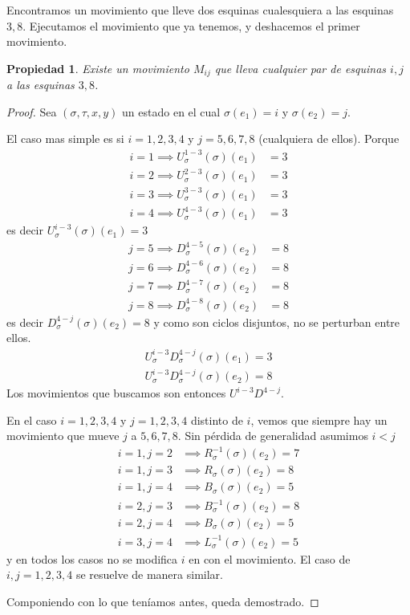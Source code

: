 \documentclass{article}
\newtheorem{propiedad}{Propiedad}[section]
\theoremstyle{definition}
\begin{document}
Encontramos un movimiento que lleve dos esquinas cualesquiera a las esquinas $3,8$. Ejecutamos el movimiento que ya tenemos, y deshacemos el primer movimiento.
\begin{propiedad}
    Existe un movimiento $M_{ij}$ que lleva cualquier par de esquinas $i,j$ a las esquinas $3,8$.
\end{propiedad}
\begin{proof}
    Sea $(\sigma,\tau,x,y)$ un estado en el cual $\sigma(e_1)=i$ y $\sigma(e_2)=j$.

    El caso mas simple es si $i=1,2,3,4$ y $j=5,6,7,8$ (cualquiera de ellos). Porque
    \begin{align*}
        i=1\implies U^{1-3}_\sigma(\sigma)(e_1) & =3 \\
        i=2\implies U^{2-3}_\sigma(\sigma)(e_1) & =3 \\
        i=3\implies U^{3-3}_\sigma(\sigma)(e_1) & =3 \\
        i=4\implies U^{4-3}_\sigma(\sigma)(e_1) & =3
    \end{align*}
    es decir $U_\sigma^{i-3}(\sigma)(e_1)=3$
    \begin{align*}
        j=5\implies D^{4-5}_\sigma(\sigma)(e_2) & =8 \\
        j=6\implies D^{4-6}_\sigma(\sigma)(e_2) & =8 \\
        j=7\implies D^{4-7}_\sigma(\sigma)(e_2) & =8 \\
        j=8\implies D^{4-8}_\sigma(\sigma)(e_2) & =8
    \end{align*}
    es decir $D_\sigma^{4-j}(\sigma)(e_2)=8$ y como son ciclos disjuntos, no se perturban entre ellos.
    \begin{align*}
        U_\sigma^{i-3}D^{4-j}_\sigma(\sigma)(e_1)=3 \\
        U_\sigma^{i-3}D^{4-j}_\sigma(\sigma)(e_2)=8
    \end{align*}
    Los movimientos que buscamos son entonces $U^{i-3}D^{4-j}$.

    En el caso $i=1,2,3,4$ y $j=1,2,3,4$ distinto de $i$, vemos que siempre hay un movimiento que mueve $j$ a $5,6,7,8$. Sin pérdida de generalidad asumimos $i<j$
    \begin{align*}
        i=1, j=2 & \implies R^{-1}_\sigma(\sigma)(e_2)=7 \\
        i=1,j=3  & \implies R_{\sigma}(\sigma)(e_2)=8    \\
        i=1,j=4  & \implies B_\sigma(\sigma)(e_2)=5      \\
        i=2,j=3  & \implies B_\sigma^{-1}(\sigma)(e_2)=8 \\
        i=2,j=4  & \implies B_\sigma(\sigma)(e_2)=5      \\
        i=3,j=4  & \implies L^{-1}_\sigma(\sigma)(e_2)=5
    \end{align*}
    y en todos los casos no se modifica $i$ en con el movimiento. El caso de $i,j=1,2,3,4$ se resuelve de manera similar.

    Componiendo con lo que teníamos antes, queda demostrado.
\end{proof}
\end{document}

